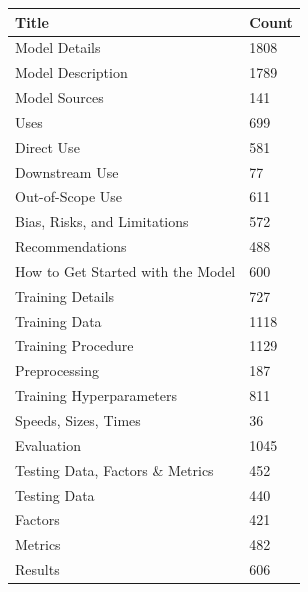 \documentclass[12pt,a4paper, oneside, openright]{book}
\begin{document}
\begin{table}[h!]
    \centering
    \begin{tabular}{|p{9cm}|p{4cm}|}
        \hline
        \textbf{Title} & \textbf{Count}\\ \hline
           Model Details
           & 1808
        \\ \hline     
           Model Description
           & 1789
        \\ \hline
           Model Sources    
           & 141
        \\ \hline
           Uses            
           & 699
        \\ \hline
           Direct Use            
           & 581
        \\ \hline
           Downstream Use      
           & 77
        \\ \hline
           Out-of-Scope Use     
           & 611
        \\ \hline
           Bias, Risks, and Limitations
           & 572
        \\ \hline
           Recommendations             
           & 488
        \\ \hline
           How to Get Started with the Model             
           & 600
        \\ \hline
           Training Details             
           & 727
        \\ \hline
            Training Data    
           & 1118
        \\ \hline
            Training Procedure            
           & 1129
        \\ \hline
            Preprocessing
           & 187
        \\ \hline
            Training Hyperparameters 
           & 811
        \\ \hline
            Speeds, Sizes, Times 
           & 36
        \\ \hline
           Evaluation            
           & 1045
        \\ \hline
           Testing Data, Factors \& Metrics 
           & 452
        \\ \hline
           Testing Data  
           & 440
        \\ \hline
           Factors 
           & 421
        \\ \hline
           Metrics 
           & 482
        \\ \hline
           Results 
           & 606
        \\ \hline

\end{tabular}
\end{table}
\end{document}
